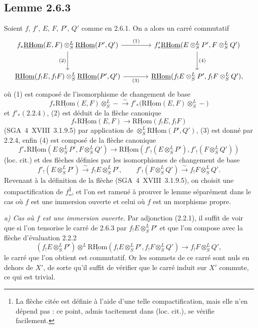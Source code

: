 \documentclass[11pt]{article}
\providecommand{\RHom}{\mathrm{RHom}}
\providecommand{\uRHom}{\underline{\RHom}}
\providecommand{\RHom}{\mathrm{RHom}}
\providecommand{\RHom}{\mathrm R\mathcal{H}om}
\providecommand{\RHom}{\mathrm{RHom}}
\begin{document}
\subsection*{Lemme 2.6.3}
Soient $f$, $f'$, $E$, $F$, $P'$, $Q'$ comme en 2.6.1. On a alors un carré commutatif
\[
\begin{tikzcd}[column sep=large,row sep=large]
f_*\uRHom(E,F)\otimes^L_S\uRHom(P',Q') \arrow[r,"(1)"] \arrow[d,"(2)"'] & f'_*\uRHom(E\otimes^L_SP',F\otimes^L_SQ') \arrow[d,"(4)"]\\
\uRHom(f_!E,f_!F)\otimes^L_S\uRHom(P',Q') \arrow[r,"(3)"'] & \uRHom(f_!E\otimes^L_SP',f_!F\otimes^L_SQ'),
\end{tikzcd}
\]
où (1) est composé de l'isomorphisme de changement de base
\[
f_*\uRHom(E,F)\otimes^L_S -\xrightarrow{\sim}f'_*\bigl(\uRHom(E,F)\otimes^L_S-\bigr)
\]
et $f'_*(2.2.4)$, (2) est déduit de la flèche canonique
\[
f_*\uRHom(E,F)\longrightarrow\uRHom(f_!E,f_!F)
\]
(SGA~4~XVIII~3.1.9.5) par application de $\otimes^L_S\uRHom(P',Q')$, (3) est donné par 2.2.4, enfin (4) est composé de la flèche canonique
\[
f'_*\uRHom(E\otimes^L_SP',F\otimes^L_SQ')
\longrightarrow
\uRHom(f'_!(E\otimes^L_SP'),f'_!(F\otimes^L_SQ'))
\]
(loc. cit.) et des flèches définies par les isomorphismes de changement de base
\[
f'_!(E\otimes^L_SP')\xrightarrow{\sim}f_!E\otimes^L_SP',
\qquad
f'_!(F\otimes^L_SQ')\xrightarrow{\sim}f_!F\otimes^L_SQ'.
\]
Revenant à la définition de la flèche (SGA~4~XVIII~3.1.9.5), on choisit une compactification de $f$\footnote{La flèche citée est définie à l'aide d'une telle compactification, mais elle n'en dépend pas : ce point, admis tacitement dans (loc. cit.), se vérifie facilement.}, et l'on est ramené à prouver le lemme séparément dans le cas où $f$ est une immersion ouverte et celui où $f$ est un morphisme propre.

\emph{a) Cas où $f$ est une immersion ouverte.} Par adjonction (2.2.1), il suffit de voir que si l'on tensorise le carré de 2.6.3 par $f_!E\otimes^L_SP'$ et que l'on compose avec la flèche d'évaluation 2.2.2
\[
(f_!E\otimes^L_SP')\otimes^L\uRHom(f_!E\otimes^L_SP',f_!F\otimes^L_SQ')\longrightarrow f_!F\otimes^L_SQ',
\]
le carré que l'on obtient est commutatif. Or les sommets de ce carré sont nuls en dehors de $X'$, de sorte qu'il suffit de vérifier que le carré induit sur $X'$ commute, ce qui est trivial.
\end{document}
